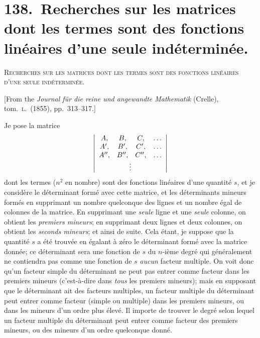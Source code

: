 \documentclass[11pt,a4paper]{article}
\begin{document}
\section*{138.\ Recherches sur les matrices dont les termes sont des fonctions lin\'eaires d'une seule ind\'etermin\'ee.}

\begin{center}\textsc{Recherches sur les matrices dont les termes sont des fonctions lin\'eaires d'une seule ind\'etermin\'ee.}\end{center}

[From the \textit{Journal f\"ur die reine und angewandte Mathematik} (Crelle), tom.\ \textsc{l}.\ (1855), pp.\ 313--317.]

\medskip

\noindent Je pose la matrice
\[
\left\lvert\begin{array}{cccc}
A, & B, & C, & \ldots\\
A', & B', & C', & \ldots\\
A'', & B'', & C'', & \ldots\\
\multicolumn{4}{c}{\vdots}
\end{array}\right\rvert
\]
dont les termes ($n^2$ en nombre) sont des fonctions lin\'eaires d'une quantit\'e $s$, et je consid\`ere le d\'eterminant form\'e avec cette matrice, et les d\'eterminants mineurs form\'es en supprimant un nombre quelconque des lignes et un nombre \'egal de colonnes de la matrice. En supprimant une \textit{seule} ligne et une \textit{seule} colonne, on obtient les \textit{premiers mineurs}; en supprimant deux lignes et deux colonnes, on obtient les \textit{seconds mineurs}; et ainsi de suite. Cela \'etant, je suppose que la quantit\'e $s$ a \'et\'e trouv\'ee en \'egalant \`a z\'ero le d\'eterminant form\'e avec la matrice donn\'ee; ce d\'eterminant sera une fonction de $s$ du $n$-i\`eme degr\'e qui g\'en\'eralement ne contiendra pas comme une fonction de $s$ \textit{aucun} facteur multiple. On voit donc qu'un facteur simple du d\'eterminant ne peut pas entrer comme facteur dans les premiers mineurs (c'est-\`a-dire dans \textit{tous} les premiers mineurs); mais en supposant que le d\'eterminant ait des facteurs multiples, un facteur multiple du d\'eterminant peut entrer comme facteur (simple ou multiple) dans les premiers mineurs, ou dans les mineurs d'un ordre plus \'elev\'e. Il importe de trouver le degr\'e selon lequel un facteur multiple du d\'eterminant peut entrer comme facteur des premiers mineurs, ou des mineurs d'un ordre quelconque donn\'e.
\end{document}

